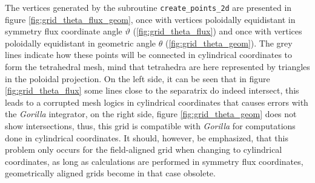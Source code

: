 \documentclass[./main.tex]{subfiles}
\begin{document}
The vertices generated by the subroutine \texttt{create\_points\_2d} are presented in figure \ref{fig:grid_theta_flux_geom}, once with vertices poloidally equidistant in symmetry flux coordinate angle $\vartheta$ (\ref{fig:grid_theta_flux}) and once with vertices poloidally equidistant in geometric angle $\theta$ (\ref{fig:grid_theta_geom}). The grey lines indicate how these points will be connected in cylindrical coordinates to form the tetrahedral mesh, mind that tetrahedra are here represented by triangles in the poloidal projection. On the left side, it can be seen that in figure \ref{fig:grid_theta_flux} some lines close to the separatrix do indeed intersect, this leads to a corrupted mesh logics in cylindrical coordinates that causes errors with the \textit{Gorilla} integrator, on the right side, figure \ref{fig:grid_theta_geom} does not show intersections, thus, this grid is compatible with \textit{Gorilla} for computations done in cylindrical coordinates. It should, however, be emphasized, that this problem only occurs for the field-aligned grid when changing to cylindrical coordinates, as long as calculations are performed in symmetry flux coordinates, geometrically aligned grids become in that case obsolete.
\end{document}

